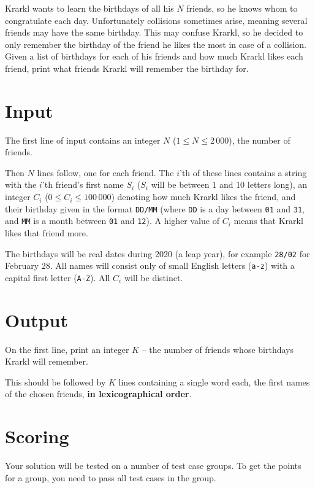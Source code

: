 \def\version{jury-3}
\noindent
Krarkl wants to learn the birthdays of all his $N$ friends, so he knows whom to congratulate each day.
Unfortunately collisions sometimes arise, meaning several friends may have the same birthday.
This may confuse Krarkl, so he decided to only remember the birthday of the friend he likes the most in case of a collision.
Given a list of birthdays for each of his friends and how much Krarkl likes each friend, print what friends Krarkl will remember the birthday for.

\section*{Input}
The first line of input contains an integer $N$ ($1 \leq N \leq 2\,000$), the number of friends.

Then $N$ lines follow, one for each friend.
The $i$'th of these lines contains a string with the $i$'th friend's first name $S_i$ ($S_i$ will be between $1$ and $10$ letters long), an integer $C_i$ ($0 \leq C_i \leq 100\,000$) denoting how much Krarkl likes the friend, and their birthday given in the format \texttt{DD/MM} (where \texttt{DD} is a day between \texttt{01} and \texttt{31}, and \texttt{MM} is a month between \texttt{01} and \texttt{12}).
A higher value of $C_i$ means that Krarkl likes that friend more.

The birthdays will be real dates during 2020 (a leap year), for example \texttt{28/02} for February 28.
All names will consist only of small English letters (\texttt{a-z}) with a capital first letter (\texttt{A-Z}).
All $C_i$ will be distinct.

\section*{Output}
On the first line, print an integer $K$ -- the number of friends whose birthdays Krarkl will remember.

This should be followed by $K$ lines containing a single word each, the first names of the chosen friends, \textbf{in lexicographical order}.

\section*{Scoring}
Your solution will be tested on a number of test case groups.
To get the points for a group, you need to pass all test cases in the group.

